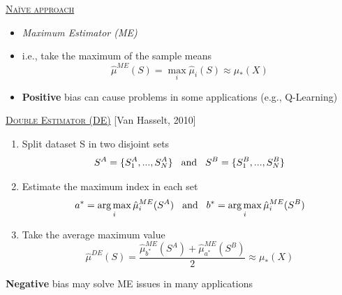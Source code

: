 \documentclass[portrait,a0paper,fontscale=0.312]{baposter}
\newcommand{\listhead}[1] {\textsc{\underline{#1}}}
\newcommand{\dbacks}[1]{\textbf{\textcolor{red!80!black}{{#1}}}}
\newcommand{\compresslist}{%
\setlength{\itemsep}{1pt}%
\setlength{\parskip}{0pt}%
\setlength{\parsep}{0pt}%
}
\begin{document}
\begin{poster}
{\vspace{.4cm}
\begin{minipage}[t]{.36\textwidth}
  \listhead{Na{\"i}ve approach}
  \begin{itemize}
    \item \emph{Maximum Estimator (ME)}
    \item i.e., take the maximum of the sample means
$$\hat{\mu}^{ME}(S) = \max_{i}\hat{\mu}_{i}(S) \approx \mu_{*}(X)$$
  \item \dbacks{Positive} bias can cause problems in some applications (e.g., Q-Learning)
  \end{itemize}
\end{minipage}\hspace{.5cm}
\begin{minipage}[t]{.59\textwidth}
\listhead{Double Estimator (DE)} [Van Hasselt, 2010] \vspace{-.5cm}\\
\begin{enumerate}\compresslist
\item Split dataset S in two disjoint sets
    \vspace{-.2cm}
$$S^A = \lbrace S^A_{1}, ..., S^A_{N} \rbrace \text{\hspace{.3cm}and\hspace{.3cm}} S^B = \lbrace S^B_{1}, ..., S^B_{N} \rbrace$$
\item \vspace{-.2cm}Estimate the maximum index in each set
    \vspace{-.2cm}
$$a^* = \operatorname*{arg\,max}_{i}\hat\mu^{ME}_{i}(S^A) \text{\hspace{.3cm}and\hspace{.3cm}} b^* = \operatorname*{arg\,max}_{i}\hat\mu^{ME}_{i}(S^B)$$
\item \vspace{-.2cm}Take the average maximum value
    \vspace{-.2cm}
$$\hat{\mu}^{DE}(S) = \frac{\hat{\mu}_{b^*}^{ME}(S^A) + \hat{\mu}_{a^*}^{ME}(S^B)}{2} \approx \mu_{*}(X)$$
\end{enumerate}
\vspace{-.2cm}
\hspace{.2cm} \dbacks{Negative} bias may solve ME issues in many applications
\end{minipage}
\vspace{-.2cm}
}
\end{poster}
\end{document}
